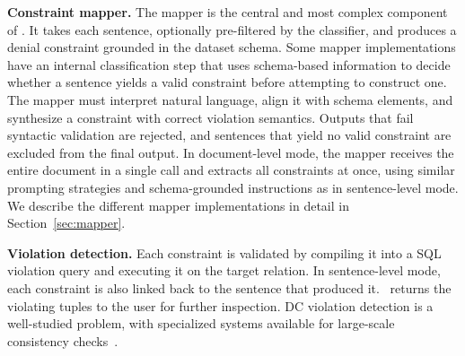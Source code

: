 \smallskip\noindent\textbf{Constraint mapper.}
The mapper is the central and most complex component of \system. It takes each sentence, optionally pre-filtered by the classifier, and produces a denial constraint grounded in the dataset schema. Some mapper implementations have an internal classification step that uses schema-based information to decide whether a sentence yields a valid constraint before attempting to construct one.
The mapper must interpret natural language, align it with schema elements, and synthesize a constraint with correct violation semantics. Outputs that fail syntactic validation are rejected, and sentences that yield no valid constraint are excluded from the final output. In document-level mode, the mapper receives the entire document in a single call and
extracts all constraints at once, using similar prompting strategies and schema-grounded instructions as in sentence-level mode. We describe the different mapper implementations in detail in Section~\ref{sec:mapper}.


\smallskip\noindent\textbf{Violation detection.}
Each constraint is validated by compiling it into a SQL violation query and executing it on the target relation. In sentence-level mode, each constraint is also linked back to the sentence that produced it. \system\ returns the violating tuples to the user for further inspection. DC violation detection is a well-studied problem, with specialized systems available for large-scale consistency checks~\cite{facet2021,liu2024rapidash,youri2024}.

